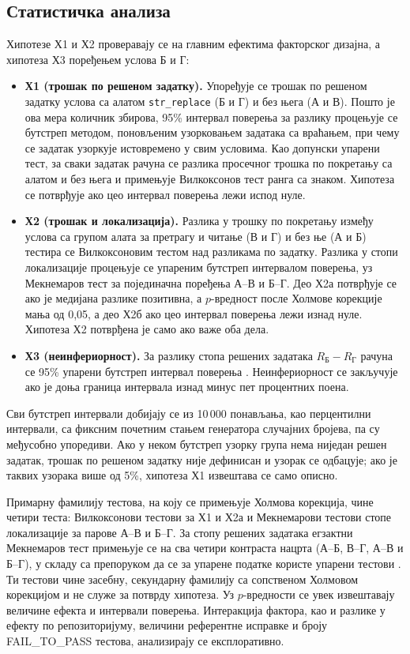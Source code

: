 \documentclass[12pt,a4paper]{report}
\begin{document}
	\subsection{Статистичка анализа}

	Хипотезе Х1 и Х2 проверавају се на главним ефектима факторског дизајна, а
	хипотеза Х3 поређењем услова Б и Г:
	\begin{itemize}
		\item \textbf{Х1 (трошак по решеном задатку).} Упоређује се трошак по
		решеном задатку услова са алатом \texttt{str\_replace} (Б и Г) и без
		њега (А и В). Пошто је ова мера количник збирова, 95\% интервал
		поверења за разлику процењује се бутстреп методом, поновљеним
		узорковањем задатака са враћањем, при чему се задатак узоркује
		истовремено у свим условима. Као допунски упарени тест, за сваки задатак
		рачуна се разлика просечног трошка по покретању са алатом и без њега и
		примењује Вилкоксонов тест ранга са знаком. Хипотеза се потврђује ако цео
		интервал поверења лежи испод нуле.
		\item \textbf{Х2 (трошак и локализација).} Разлика у трошку по покретању
		између услова са групом алата за претрагу и читање (В и Г) и без ње (А и
		Б) тестира се Вилкоксоновим тестом над разликама по задатку. Разлика у
		стопи локализације процењује се упареним бутстреп интервалом поверења,
		уз Мекнемаров тест за појединачна поређења А--В и Б--Г. Део Х2а
		потврђује се ако је медијана разлике позитивна, а $p$-вредност после
		Холмове корекције мања од 0,05, а део Х2б ако цео интервал поверења лежи
		изнад нуле. Хипотеза Х2 потврђена је само ако важе оба дела.
		\item \textbf{Х3 (неинфериорност).} За разлику стопа решених задатака
		$R_{\text{Б}} - R_{\text{Г}}$ рачуна се 95\% упарени бутстреп интервал
		поверења \parencite{efron1993bootstrap}. Неинфериорност се закључује ако
		је доња граница интервала изнад минус пет процентних поена.
	\end{itemize}

	Сви бутстреп интервали добијају се из 10\,000 понављања, као перцентилни
	интервали, са фиксним почетним стањем генератора случајних бројева, па су
	међусобно упоредиви. Ако у неком бутстреп узорку група нема ниједан решен
	задатак, трошак по решеном задатку није дефинисан и узорак се одбацује; ако
	је таквих узорака више од 5\%, хипотеза Х1 извештава се само описно.
	
	Примарну фамилију тестова, на коју се примењује Холмова корекција, чине
	четири теста: Вилкоксонови тестови за Х1 и Х2а и Мекнемарови тестови стопе
	локализације за парове А--В и Б--Г. За стопу решених задатака егзактни
	Мекнемаров тест \parencite{mcnemar1947} примењује се на сва четири контраста
	нацрта (А--Б, В--Г, А--В и Б--Г), у складу са препоруком да се за упарене
	податке користе упарени тестови \parencite{dror2018hitchhiker}. Ти тестови
	чине засебну, секундарну фамилију са сопственом Холмовом корекцијом и не
	служе за потврду хипотеза. Уз $p$-вредности се увек
	извештавају величине ефекта и интервали поверења. Интеракција фактора, као
	и разлике у ефекту по репозиторијуму, величини референтне исправке и броју
	FAIL\_TO\_PASS тестова, анализирају се експлоративно.
	
\end{document}
